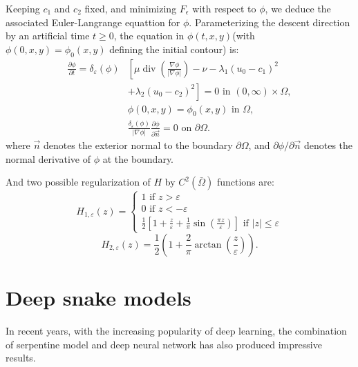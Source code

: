 \documentclass[journal]{IEEEtran}
\begin{document}
Keeping $c_1$ and $c_2$ fixed, and minimizing $F_\epsilon$ with respect to $\phi$, we deduce the associated Euler-Langrange equattion for $\phi$. Parameterizing the descent direction by an artificial time $t\geq 0$, the equation in $\phi(t,x,y)$(with $\phi(0,x,y)=\phi_0(x,y)$ defining the initial contour) is:
\begin{equation}\begin{aligned}
    \frac{\partial \phi}{\partial t}=\delta_{\varepsilon}(\phi) &\left[\mu \operatorname{div}\left(\frac{\nabla \phi}{|\nabla \phi|}\right)-\nu-\lambda_{1}\left(u_{0}-c_{1}\right)^{2}\right.\\
    &\left.+\lambda_{2}\left(u_{0}-c_{2}\right)^{2}\right]=0 \text { in }(0, \infty) \times \Omega, \\
    & \phi(0, x, y)=\phi_{0}(x, y) \text { in } \Omega, \\
    & \frac{\delta_{\varepsilon}(\phi)}{|\nabla \phi|} \frac{\partial \phi}{\partial \vec{n}}=0 \text { on } \partial \Omega.
\end{aligned}\end{equation}
where $\vec{n}$ denotes the exterior normal to the boundary $\partial\Omega$, and $\partial\phi/\partial\vec{n}$ denotes the normal derivative of $\phi$ at the boundary.

And two possible regularization of $H$ by $C^2(\bar{\Omega})$ functions are:
\begin{equation}
  H_{1, \varepsilon}(z)=\left\{\begin{array}{l}
  1 \text { if } z>\varepsilon \\
  0 \text { if } z<-\varepsilon \\
  \frac{1}{2}\left[1+\frac{z}{\varepsilon}+\frac{1}{\pi} \sin \left(\frac{\pi z}{\varepsilon}\right)\right] \text { if }|z| \leq \varepsilon
  \end{array}\right.
\end{equation}
\begin{equation}
  H_{2, \varepsilon}(z)=\frac{1}{2}\left(1+\frac{2}{\pi} \arctan \left(\frac{z}{\varepsilon}\right)\right) .
\end{equation}

\section{Deep snake models}
In recent years, with the increasing popularity of deep learning, the combination of serpentine model and deep neural network has also produced impressive results.
\end{document}
